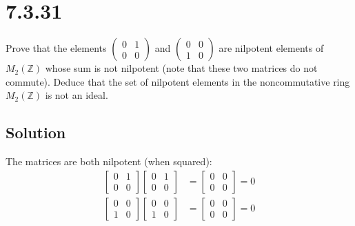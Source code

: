 \documentclass[fleqn]{article}
\begin{document}
    \section{7.3.31}
    Prove that the elements $\begin{pmatrix}
        0 & 1 \\
        0 & 0
    \end{pmatrix}$ and $\begin{pmatrix}
        0 & 0 \\
        1 & 0
    \end{pmatrix}$ are nilpotent elements of $M_2(\mathbb{Z})$ whose sum is not nilpotent (note that these two matrices do not commute).  Deduce that the set of nilpotent elements in the noncommutative ring $M_2(\mathbb{Z})$ is not an ideal.
        
        \subsection{Solution}
        The matrices are both nilpotent (when squared):
        \begin{align}
            \begin{bmatrix}
                0 & 1 \\
                0 & 0
            \end{bmatrix} \begin{bmatrix}
                0 & 1 \\
                0 & 0
            \end{bmatrix} &= \begin{bmatrix}
                0 & 0 \\
                0 & 0
            \end{bmatrix} = 0 \\
            \begin{bmatrix}
                0 & 0 \\
                1 & 0
            \end{bmatrix} \begin{bmatrix}
                0 & 0 \\
                1 & 0
            \end{bmatrix} &= \begin{bmatrix}
                0 & 0 \\
                0 & 0
            \end{bmatrix} = 0
        \end{align}
\end{document}
